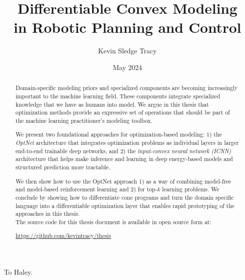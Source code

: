 \documentclass[12pt]{cmuthesis}
\begin{document}
\frontmatter

\pagestyle{empty}

\title{{\bf Differentiable Convex Modeling \\in Robotic Planning and Control}}
\author{Kevin Sledge Tracy}
\date{May 2024}


\support{}
\disclaimer{}


\maketitle

\begin{dedication}
  To Haley.
\end{dedication}

\begin{abstract}
  Domain-specific modeling priors and specialized components are
  becoming increasingly important to the machine learning field.
  These components integrate specialized knowledge that we have
  as humans into model.
  We argue in this thesis that optimization methods provide an
  expressive set of operations that should be part of the
  machine learning practitioner's modeling toolbox.

  We present two foundational approaches for optimization-based modeling:
  1) the \emph{OptNet} architecture that integrates
  optimization problems as individual layers in larger end-to-end
  trainable deep networks, and
  2) the \emph{input-convex neural network (ICNN)}
  architecture that helps make inference and learning in deep
  energy-based models and structured prediction more tractable.

  We then show how to use the OptNet approach
  1) as a way of combining model-free and model-based reinforcement
  learning and
  2) for top-$k$ learning problems.
  We conclude by showing how to differentiate cone programs
  and turn the \cvxpy domain specific language into
  a differentiable optimization layer that enables rapid prototyping of
  the approaches in this thesis. \\

  \noindent
  The source code for this thesis document is available in open source form at:
  \begin{center}
  \url{https://github.com/kevintracy/thesis}
  \end{center}
\end{abstract}
\end{document}
